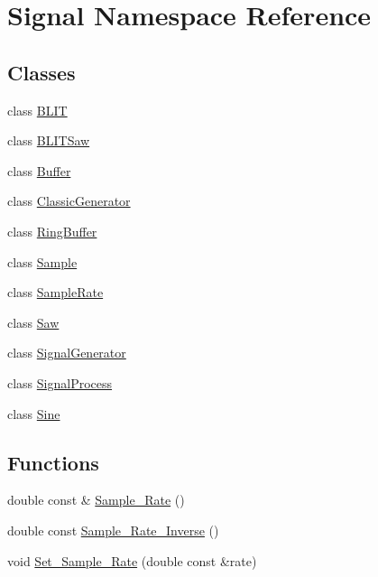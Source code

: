 \hypertarget{namespace_signal}{\section{Signal Namespace Reference}
\label{namespace_signal}
}
\subsection*{Classes}
\begin{DoxyCompactItemize}
\item 
class \hyperlink{class_signal_1_1_b_l_i_t}{B\+L\+I\+T}
\item 
class \hyperlink{class_signal_1_1_b_l_i_t_saw}{B\+L\+I\+T\+Saw}
\item 
class \hyperlink{class_signal_1_1_buffer}{Buffer}
\item 
class \hyperlink{class_signal_1_1_classic_generator}{Classic\+Generator}
\item 
class \hyperlink{class_signal_1_1_ring_buffer}{Ring\+Buffer}
\item 
class \hyperlink{class_signal_1_1_sample}{Sample}
\item 
class \hyperlink{class_signal_1_1_sample_rate}{Sample\+Rate}
\item 
class \hyperlink{class_signal_1_1_saw}{Saw}
\item 
class \hyperlink{class_signal_1_1_signal_generator}{Signal\+Generator}
\item 
class \hyperlink{class_signal_1_1_signal_process}{Signal\+Process}
\item 
class \hyperlink{class_signal_1_1_sine}{Sine}
\end{DoxyCompactItemize}
\subsection*{Functions}
\begin{DoxyCompactItemize}
\item 
double const \& \hyperlink{namespace_signal_ae7b1f222afc010e0f33f306f978fcde9}{Sample\+\_\+\+Rate} ()
\item 
double const \hyperlink{namespace_signal_ae7e8bbfcac6571aaaf18d7f96f3fefc3}{Sample\+\_\+\+Rate\+\_\+\+Inverse} ()
\item 
void \hyperlink{namespace_signal_a2f163a7bbf1b0fc76ceba8b0916a7890}{Set\+\_\+\+Sample\+\_\+\+Rate} (double const \&rate)
\end{DoxyCompactItemize}


